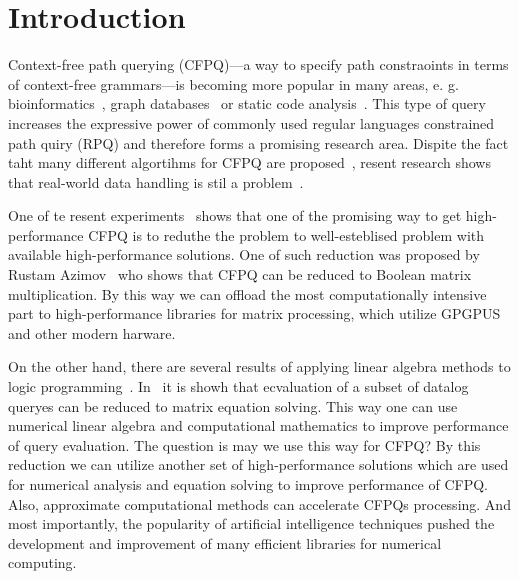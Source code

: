 \documentclass[sigconf]{acmart}
\begin{document}



\maketitle

\section{Introduction}

Context-free path querying (CFPQ)---a way to specify path constraoints in terms of context-free grammars---is becoming more popular in many areas, e. g. bioinformatics~\cite{sevon2008subgraph}, graph databases~\cite{yannakakis1990graph,Medeiros:2018:EEC:3167132.3167265,Kuijpers:2019:ESC:3335783.3335791} or static code analysis~\cite{Reps,zhang2013fast}. 
This type of query increases the expressive power of commonly used regular languages constrained path quiry (RPQ) and therefore forms a promising research area.
Dispite the fact taht many different algortihms for CFPQ are proposed~\cite{RDF,Medeiros:2018:EEC:3167132.3167265,azimov2018context,Verbitskaia:2018:PCC:3241653.3241655,10.1007/978-3-319-91662-0_17}, resent research shows that real-world data handling is stil a problem~\cite{Kuijpers:2019:ESC:3335783.3335791}.

One of te resent experiments~\cite{mishin2019evaluation} shows that one of the promising way to get high-performance CFPQ is to reduthe the problem to well-esteblised problem with available high-performance solutions.
One of such reduction was proposed by Rustam Azimov~\cite{azimov2018context} who shows that CFPQ can be reduced to Boolean matrix multiplication.
By this way we can offload the most computationally intensive part to high-performance libraries for matrix processing, which utilize GPGPUS and other modern harware.

On the other hand, there are several results of applying linear algebra methods to logic programming~\cite{sato2017linear, aspis2018linear}. 
In~\cite{sato2017linear} it is showh that ecvaluation of a subset of datalog queryes can be reduced to matrix equation solving.  
This way one can use numerical linear algebra and computational mathematics to improve performance of query evaluation.
The question is may we use this way for CFPQ?
By this reduction we can utilize another set of high-performance solutions which are used for numerical analysis and equation solving to improve performance of CFPQ.
Also, approximate computational methods can accelerate CFPQs processing.
And most importantly, the popularity of artificial intelligence techniques pushed the development and improvement of many efficient libraries for numerical computing.
\end{document}
